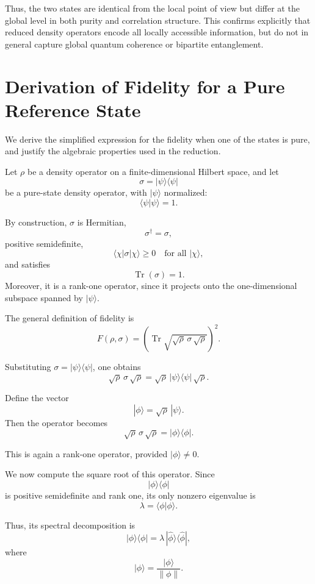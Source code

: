 \documentclass[a4paper]{article}
\begin{document}
Thus, the two states are identical from the local point of view but differ at the global level in both purity and correlation structure. This confirms explicitly that reduced density operators encode all locally accessible information, but do not in general capture global quantum coherence or bipartite entanglement.

\section{Derivation of Fidelity for a Pure Reference State}

We derive the simplified expression for the fidelity when one of the states is pure, and justify the algebraic properties used in the reduction.

\medskip

Let $\rho$ be a density operator on a finite-dimensional Hilbert space, and let
\[
\sigma = |\psi\rangle\langle\psi|
\]
be a pure-state density operator, with $|\psi\rangle$ normalized:
\[
\langle \psi | \psi \rangle = 1.
\]

By construction, $\sigma$ is Hermitian,
\[
\sigma^\dagger = \sigma,
\]
positive semidefinite,
\[
\langle \chi | \sigma | \chi \rangle \ge 0
\quad \text{for all } |\chi\rangle,
\]
and satisfies
\[
\operatorname{Tr}(\sigma) = 1.
\]
Moreover, it is a rank-one operator, since it projects onto the one-dimensional subspace spanned by $|\psi\rangle$.

\medskip

The general definition of fidelity is
\[
F(\rho,\sigma)
=
\left(\operatorname{Tr}\sqrt{\sqrt{\rho}\,\sigma\,\sqrt{\rho}}\right)^2.
\]

Substituting $\sigma = |\psi\rangle\langle\psi|$, one obtains
\[
\sqrt{\rho}\,\sigma\,\sqrt{\rho}
=
\sqrt{\rho}\,|\psi\rangle\langle\psi|\,\sqrt{\rho}.
\]

Define the vector
\[
|\phi\rangle = \sqrt{\rho}\,|\psi\rangle.
\]
Then the operator becomes
\[
\sqrt{\rho}\,\sigma\,\sqrt{\rho}
=
|\phi\rangle\langle\phi|.
\]

This is again a rank-one operator, provided $|\phi\rangle \neq 0$.

\medskip

We now compute the square root of this operator. Since
\[
|\phi\rangle\langle\phi|
\]
is positive semidefinite and rank one, its only nonzero eigenvalue is
\[
\lambda = \langle \phi | \phi \rangle.
\]

Thus, its spectral decomposition is
\[
|\phi\rangle\langle\phi|
=
\lambda\,|\hat{\phi}\rangle\langle\hat{\phi}|,
\]
where
\[
|\hat{\phi}\rangle = \frac{|\phi\rangle}{\|\phi\|}.
\]
\end{document}
